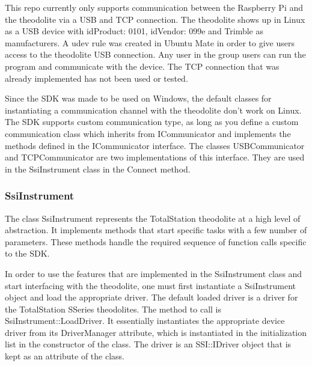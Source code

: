 \documentclass[10pt,letterpaper,oneside]{article}
\begin{document}
This repo currently only supports communication between the Raspberry Pi and the theodolite via a USB and TCP connection. 
The theodolite shows up in Linux as a USB device with idProduct: 0101, idVendor: 099e and Trimble as manufacturers. 
A udev rule was created in Ubuntu Mate in order to give users access to the theodolite USB connection.
Any user in the group users can run the program and communicate with the device. 
The TCP connection that was already implemented has not been used or tested.

Since the SDK was made to be used on Windows, the default classes for instantiating a communication channel with the theodolite don't work on Linux. 
The SDK supports custom communication type, as long as you define a custom communication class which inherits from ICommunicator and implements the methods defined in the ICommunicator interface.
The classes USBCommunicator and TCPCommunicator are two implementations of this interface. They are used in the SsiInstrument class in the Connect method.

\subsubsection{SsiInstrument}

The class SsiInstrument represents the TotalStation theodolite at a high level of abstraction. 
It implements methods that start specific tasks with a few number of parameters. 
These methods handle the required sequence of function calls specific to the SDK.

In order to use the features that are implemented in the SsiInstrument class and start interfacing with the theodolite, one must first instantiate a SsiInstrument object and load the appropriate driver. 
The default loaded driver is a driver for the TotalStation SSeries theodolites. 
The method to call is SsiInstrument::LoadDriver. 
It essentially instantiates the appropriate device driver from its DriverManager attribute, which is instantiated in the initialization list in the constructor of the class. 
The driver is an SSI::IDriver object that is kept as an attribute of the class.
\end{document}
